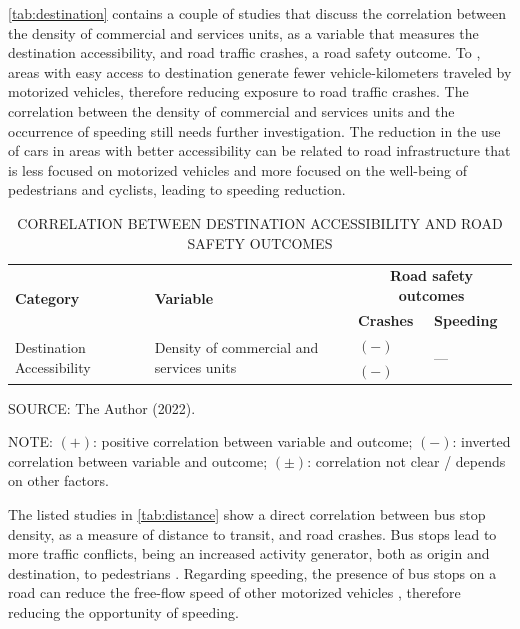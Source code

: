 \autoref{tab:destination} contains a couple of studies that discuss the correlation between the density of commercial and services units, as a variable that measures the destination accessibility, and road traffic crashes, a road safety outcome. To \textcite{Ouyang2014,Welle2016}, areas with easy access to destination generate fewer vehicle-kilometers traveled by motorized vehicles, therefore reducing exposure to road traffic crashes. The correlation between the density of commercial and services units and the occurrence of speeding still needs further investigation. The reduction in the use of cars in areas with better accessibility can be related to road infrastructure that is less focused on motorized vehicles and more focused on the well-being of pedestrians and cyclists, leading to speeding reduction. 

\begin{table}[!hbtp]
    \footnotesize
    \captionsetup{justification=raggedright,
        singlelinecheck=false,
        font=footnotesize}
    \caption{CORRELATION BETWEEN DESTINATION ACCESSIBILITY AND ROAD SAFETY OUTCOMES}
    \centering
    \begin{tabular}{p{4cm}p{4cm}p{4cm}p{2cm}}
        \hline
        \multirow{2}{4cm}{\textbf{Category}} & \multirow{2}{4cm}{\textbf{Variable}} & \multicolumn{2}{c}{\textbf{Road safety outcomes}} \\
         &  & \textbf{Crashes} & \textbf{Speeding} \\ \hline
        \multirow{3}{4cm}{Destination Accessibility} & \multirow{3}{4cm}{Density of commercial and services units} & $(-)$ \textcite{Ouyang2014} & \multirow{2}{2cm}{---} \\
         &  & $(-)$ \textcite{Welle2016} &  \\ \hline
    \end{tabular}
    \label{tab:destination}
    \par \vspace{2mm} \footnotesize \raggedright
    SOURCE: The Author (2022).
    \par \vspace{1mm} \footnotesize \raggedright
    NOTE: $(+)$: positive correlation between variable and outcome; $(-)$: inverted correlation between variable and outcome; $(\pm)$: correlation not clear / depends on other factors.
\end{table}

The listed studies in \autoref{tab:distance} show a direct correlation between bus stop density, as a measure of distance to transit, and road crashes. Bus stops lead to more traffic conflicts, being an increased activity generator, both as origin and destination, to pedestrians \cite{Kim2010}. Regarding speeding, the presence of bus stops on a road can reduce the free-flow speed of other motorized vehicles \cite{Bansal2014, Koshy2005}, therefore reducing the opportunity of speeding. 

